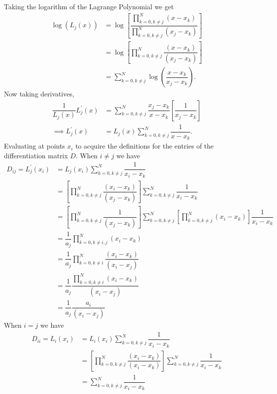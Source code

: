 \documentclass[12pt]{article}
\begin{document}
Taking the logarithm of the Lagrange Polynomial we get
\begin{subequations}
    \begin{align}
        \log(L_{j}(x)) &= \log\left[\dfrac{\prod_{k=0,k\neq j}^{N}(x-x_{k})}{\prod_{k=0,k\neq j}^{N}(x_{j}-x_{k})}\right]\\
        & = \log\left[\prod_{k=0,k\neq j}^{N}\dfrac{(x-x_{k})}{(x_{j}-x_{k})}\right]\\
        &= \sum_{k=0,k\neq j}^{N} \log\left(\dfrac{x-x_{k}}{x_{j}-x_{k}}\right).
    \end{align}
\end{subequations}
Now taking derivatives,
\begin{subequations}
    \begin{align}
        \dfrac{1}{L_{j}(x)}L_{j}^{\prime}(x) &= \sum_{k=0,k\neq j}^{N}\dfrac{x_{j}-x_{k}}{x-x_{k}}\left[\dfrac{1}{x_{j}-x_{k}}\right]\\
        \implies L_{j}^{\prime}(x) &= L_{j}(x) \sum_{k=0,k\neq j}^{N}\dfrac{1}{x-x_{k}}.
    \end{align}
\end{subequations}
Evaluating at points $x_{i}$ to acquire the definitions for the entries of the differentiation matrix $D$. When $i\neq j$ we have
\begin{subequations}
    \begin{align}
        D_{ij} = L_{j}^{\prime}(x_{i}) &= L_{j}(x_{i}) \sum_{k=0,k\neq j}^{N}\dfrac{1}{x_{i}-x_{k}}\\
        &= \left[\prod_{k=0,k\neq j}^{N}\dfrac{(x_{i}-x_{k})}{(x_{j}-x_{k})}\right]\sum_{k=0,k\neq j}^{N}\dfrac{1}{x_{i}-x_{k}}\\
        &= \left[\prod_{k=0,k\neq j}^{N}\dfrac{1}{(x_{j}-x_{k})}\right]\sum_{k=0,k\neq j}^{N}\left[\prod_{k=0,k\neq j}^{N}(x_{i}-x_{k})\right]\dfrac{1}{x_{i}-x_{k}}\\
        &= \dfrac{1}{a_{j}}\prod_{k=0,k\neq i,j}^{N}(x_{i}-x_{k})\\
        &= \dfrac{1}{a_{j}}\prod_{k=0,k\neq i}^{N}\dfrac{(x_{i}-x_{k})}{(x_{i}-x_{j})}\\
        &= \dfrac{1}{a_{j}}\dfrac{\prod_{k=0,k\neq i}^{N}(x_{i}-x_{k})}{(x_{i}-x_{j})}\\
        &= \dfrac{1}{a_{j}}\dfrac{a_{i}}{(x_{i}-x_{j})}
    \end{align}
\end{subequations}
When $i=j$ we have
\begin{subequations}
    \begin{align}
        D_{ii} = L_{i}(x_{i}) &= L_{i}(x_{i}) \sum_{k=0,k\neq j}^{N}\dfrac{1}{x_{i}-x_{k}}\\
        &= \left[\prod_{k=0,k\neq j}^{N}\dfrac{(x_{i}-x_{k})}{(x_{i}-x_{k})}\right]\sum_{k=0,k\neq j}^{N}\dfrac{1}{x_{i}-x_{k}}\\
        &= \sum_{k=0,k\neq j}^{N}\dfrac{1}{x_{i}-x_{k}}
    \end{align}
\end{subequations}
\end{document}
